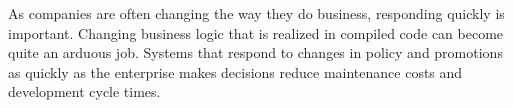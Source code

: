 As companies are often changing the way they do business,  responding
quickly is important.  Changing business logic that
is realized in compiled code can become quite an arduous job.  Systems
that respond to changes in policy and promotions as quickly as 
the enterprise makes decisions reduce maintenance costs and 
development cycle times.

